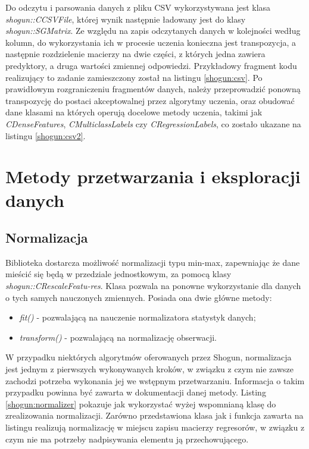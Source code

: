 Do odczytu i parsowania danych z pliku CSV wykorzystywana jest klasa \textit{shogun::CCSVFile}, której wynik następnie ładowany jest do klasy \textit{shogun::SGMatrix}. Ze względu na zapis odczytanych danych w kolejności według kolumn, do wykorzystania ich w procesie uczenia konieczna jest transpozycja, a następnie rozdzielenie macierzy na dwie części, z których jedna zawiera predyktory, a druga wartości zmiennej odpowiedzi. Przykładowy fragment kodu realizujący to zadanie zamieszczony został na listingu \ref{shogun:csv}. Po prawidłowym rozgraniczeniu fragmentów danych, należy przeprowadzić ponowną transpozycję do postaci akceptowalnej przez algorytmy uczenia, oraz obudować dane klasami na których operują docelowe metody uczenia, takimi jak \textit{CDenseFeatures}, \textit{CMulticlassLabels} czy \textit{CRegressionLabels}, co zostało ukazane na listingu \ref{shogun:csv2}.



\section{Metody przetwarzania i eksploracji danych}

\subsection{Normalizacja}

Biblioteka dostarcza możliwość normalizacji typu min-max, zapewniając że dane mieścić się będą w przedziale jednostkowym, za pomocą klasy \textit{shogun::CRescaleFeatu-res}. Klasa pozwala na ponowne wykorzystanie dla danych o tych samych nauczonych zmiennych. Posiada ona dwie główne metody:

\begin{itemize}
	\item \textit{fit()} - pozwalającą na nauczenie normalizatora statystyk danych;
	\item \textit{transform()} - pozwalającą na normalizację obserwacji.
\end{itemize}

W przypadku niektórych algorytmów oferowanych przez Shogun, normalizacja jest jednym z pierwszych wykonywanych kroków, w związku z czym nie zawsze zachodzi potrzeba wykonania jej we wstępnym przetwarzaniu. Informacja o takim przypadku powinna być zawarta w dokumentacji danej metody. Listing \ref{shogun:normalizer} pokazuje jak wykorzystać wyżej wspomnianą klasę do zrealizowania normalizacji. Zarówno przedstawiona klasa jak i funkcja zawarta na listingu realizują normalizację w miejscu zapisu macierzy regresorów, w związku z czym nie ma potrzeby nadpisywania elementu ją przechowującego.

